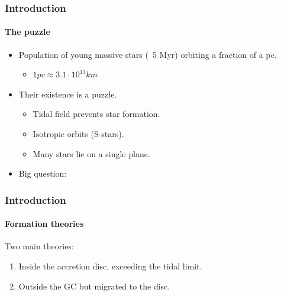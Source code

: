 \begin{frame}
    \frametitle{Introduction}
    \framesubtitle{The puzzle}
    \begin{itemize}
        \item Population of young massive stars (~5 Myr) orbiting a fraction of a pc.
        \begin{itemize}
            \item $1 pc \approx 3.1\cdot 10^{13} km$
        \end{itemize}
        \item Their existence is a puzzle.
        \begin{itemize}
            \item Tidal field prevents star formation.
            \item Isotropic orbits (S-stars).
            \item Many stars lie on a single plane.
        \end{itemize}
        \item Big question: 
    \end{itemize}
\end{frame}

\begin{frame}
    \frametitle{Introduction}
    \framesubtitle{Formation theories}
    Two main theories:
    \begin{enumerate}
        \item Inside the accretion disc, exceeding the tidal limit.
        \item Outside the GC but migrated to the disc.
    \end{enumerate}
\end{frame}
